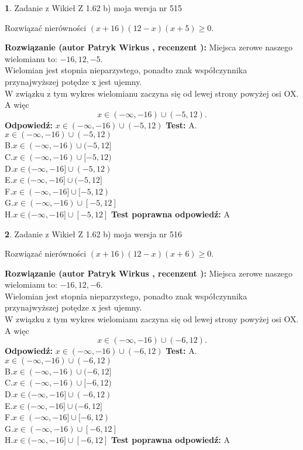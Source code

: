\documentclass[12pt, a4paper]{article}
\theoremstyle{definition} %
\newtheorem{zad}{}
\newcommand{\zadStart}[1]{\begin{zad}#1\newline}
\newcommand{\zadStop}{\end{zad}}
\newcommand{\rozwStart}[2]{\noindent \textbf{Rozwiązanie (autor #1 , recenzent #2): }\newline}
\newcommand{\rozwStop}{\newline}
\newcommand{\odpStart}{\noindent \textbf{Odpowiedź:}\newline}
\newcommand{\odpStop}{\newline}
\newcommand{\testStart}{\noindent \textbf{Test:}\newline}
\newcommand{\testStop}{\newline}
\newcommand{\kluczStart}{\noindent \textbf{Test poprawna odpowiedź:}\newline}
\newcommand{\kluczStop}{\newline}
\begin{document}
\zadStart{Zadanie z Wikieł Z 1.62 b) moja wersja nr 515}

Rozwiązać nierówności $(x+16)(12-x)(x+5)\ge0$.
\zadStop
\rozwStart{Patryk Wirkus}{}
Miejsca zerowe naszego wielomianu to: $-16, 12, -5$.\\
Wielomian jest stopnia nieparzystego, ponadto znak współczynnika przy\linebreak najwyższej potędze x jest ujemny.\\ W związku z tym wykres wielomianu zaczyna się od lewej strony powyżej osi OX. A więc $$x \in (-\infty,-16) \cup (-5,12).$$
\rozwStop
\odpStart
$x \in (-\infty,-16) \cup (-5,12)$
\odpStop
\testStart
A.$x \in (-\infty,-16) \cup (-5,12)$\\
B.$x \in (-\infty,-16) \cup (-5,12]$\\
C.$x \in (-\infty,-16) \cup [-5,12)$\\
D.$x \in (-\infty,-16] \cup (-5,12)$\\
E.$x \in (-\infty,-16] \cup (-5,12]$\\
F.$x \in (-\infty,-16] \cup [-5,12)$\\
G.$x \in (-\infty,-16) \cup [-5,12]$\\
H.$x \in (-\infty,-16] \cup [-5,12]$
\testStop
\kluczStart
A
\kluczStop



\zadStart{Zadanie z Wikieł Z 1.62 b) moja wersja nr 516}

Rozwiązać nierówności $(x+16)(12-x)(x+6)\ge0$.
\zadStop
\rozwStart{Patryk Wirkus}{}
Miejsca zerowe naszego wielomianu to: $-16, 12, -6$.\\
Wielomian jest stopnia nieparzystego, ponadto znak współczynnika przy\linebreak najwyższej potędze x jest ujemny.\\ W związku z tym wykres wielomianu zaczyna się od lewej strony powyżej osi OX. A więc $$x \in (-\infty,-16) \cup (-6,12).$$
\rozwStop
\odpStart
$x \in (-\infty,-16) \cup (-6,12)$
\odpStop
\testStart
A.$x \in (-\infty,-16) \cup (-6,12)$\\
B.$x \in (-\infty,-16) \cup (-6,12]$\\
C.$x \in (-\infty,-16) \cup [-6,12)$\\
D.$x \in (-\infty,-16] \cup (-6,12)$\\
E.$x \in (-\infty,-16] \cup (-6,12]$\\
F.$x \in (-\infty,-16] \cup [-6,12)$\\
G.$x \in (-\infty,-16) \cup [-6,12]$\\
H.$x \in (-\infty,-16] \cup [-6,12]$
\testStop
\kluczStart
A
\kluczStop
\end{document}
